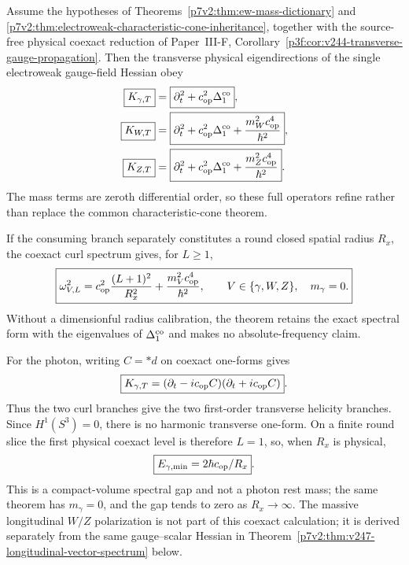 \documentclass[12pt,a4paper]{article}
\begin{document}
\begin{theorem}
\label{p7v2:thm:v244-transverse-ew-wave-operators}
Assume the hypotheses of
Theorems~\ref{p7v2:thm:ew-mass-dictionary} and
\ref{p7v2:thm:electroweak-characteristic-cone-inheritance}, together with the
source-free physical coexact reduction of Paper~III-F,
Corollary~\ref{p3f:cor:v244-transverse-gauge-propagation}.  Then the transverse
physical eigendirections of the single electroweak gauge-field Hessian obey
\begin{align}
\label{p7v2:eq:v244-transverse-ew-wave-operators}
 \boxed{K_{\gamma,T}}
 &=\boxed{\partial_t^2+c_{\rm op}^2\Delta_1^{\rm co}},\\
 \boxed{K_{W,T}}
 &=\boxed{\partial_t^2+c_{\rm op}^2\Delta_1^{\rm co}
 +\frac{m_W^2c_{\rm op}^4}{\hbar^2}},\\
 \boxed{K_{Z,T}}
 &=\boxed{\partial_t^2+c_{\rm op}^2\Delta_1^{\rm co}
 +\frac{m_Z^2c_{\rm op}^4}{\hbar^2}}.
\end{align}
The mass terms are zeroth differential order, so these full operators refine
rather than replace the common characteristic-cone theorem.

If the consuming branch separately constitutes a round closed spatial radius
\(R_x\), the coexact curl spectrum gives, for \(L\ge1\),
\begin{equation}
\label{p7v2:eq:v244-transverse-ew-spectra}
 \boxed{
 \omega_{V,L}^2
 =c_{\rm op}^2\frac{(L+1)^2}{R_x^2}
 +\frac{m_V^2c_{\rm op}^4}{\hbar^2},
 \qquad V\in\{\gamma,W,Z\},\quad m_\gamma=0.}
\end{equation}
Without a dimensionful radius calibration, the theorem retains the exact
spectral form with the eigenvalues of \(\Delta_1^{\rm co}\) and makes no
absolute-frequency claim.

For the photon, writing \(C=*d\) on coexact one-forms gives
\begin{equation}
\label{p7v2:eq:v244-photon-helicity-factorization}
 \boxed{K_{\gamma,T}
 =(\partial_t-i c_{\rm op}C)(\partial_t+i c_{\rm op}C)}.
\end{equation}
Thus the two curl branches give the two first-order transverse helicity
branches.  Since \(H^1(S^3)=0\), there is no harmonic transverse one-form.  On
a finite round slice the first physical coexact level is therefore \(L=1\),
so, when \(R_x\) is physical,
\[
 \boxed{E_{\gamma,\min}=2\hbar c_{\rm op}/R_x}.
\]
This is a compact-volume spectral gap and not a photon rest mass; the same
theorem has \(m_\gamma=0\), and the gap tends to zero as \(R_x\to\infty\).
The massive longitudinal \(W/Z\) polarization is not part of this coexact
calculation; it is derived separately from the same gauge--scalar Hessian in
Theorem~\ref{p7v2:thm:v247-longitudinal-vector-spectrum} below.
\end{theorem}
\end{document}
